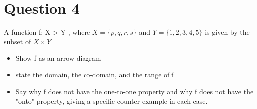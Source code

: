 
\section*{Question 4}

A function f: X-> Y , where $X = \{p,q,r,s\}$ and $Y =\{1,2,3,4,5\}$
is given by the subset of $X \times Y$


\begin{itemize}
\item Show f as an arrow diagram
\item state the domain, the co-domain, and the range of f
\item Say why f does not have the one-to-one property and why f does 
not have the "onto" property, giving a specific counter example in each case.
\end{itemize}